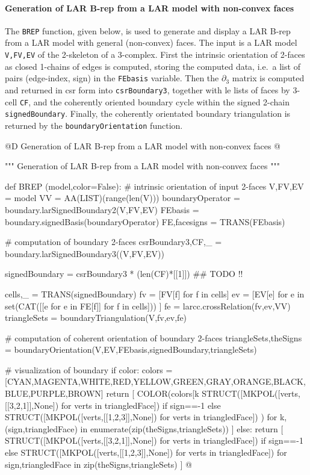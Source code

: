 \documentclass[11pt,oneside]{article}    %
\begin{document}
\paragraph{Generation of LAR B-rep from a LAR model with non-convex faces}

The \texttt{BREP} function, given below, is used to generate and display a  LAR B-rep from a LAR model with general (non-convex) faces. The input is a LAR model \texttt{V,FV,EV} of the 2-skeleton of a 3-complex. First the intrinsic orientation of 2-faces as closed 1-chains of edges is computed,  storing the computed data, i.e.~a list of pairs (edge-index, sign) in the \texttt{FEbasis} variable. Then the $\partial_3$ matrix is computed and returned in csr form into \texttt{csrBoundary3}, together with le lists of faces by 3-cell \texttt{CF}, and the coherently oriented boundary cycle within the signed 2-chain \texttt{signedBoundary}. Finally, the coherently orientated boundary triangulation is returned by the \texttt{boundaryOrientation} function.

@D Generation of LAR B-rep from a LAR model with non-convex faces
@{""" Generation of LAR B-rep from a LAR model with non-convex faces """

def BREP (model,color=False):
    # intrinsic orientation of input 2-faces
    V,FV,EV = model
    VV = AA(LIST)(range(len(V)))
    boundaryOperator = boundary.larSignedBoundary2(V,FV,EV)
    FEbasis = boundary.signedBasis(boundaryOperator)
    FE,facesigns = TRANS(FEbasis)
    
    # computation of boundary 2-faces
    csrBoundary3,CF,_ = boundary.larSignedBoundary3((V,FV,EV))
    
    signedBoundary = csrBoundary3 * (len(CF)*[[1]])  ## TODO !!
    
    cells,_ = TRANS(signedBoundary)
    fv = [FV[f] for f in cells]
    ev = [EV[e] for e in set(CAT([[e for e in FE[f]] for f in cells])) ]
    fe = larcc.crossRelation(fv,ev,VV)
    triangleSets = boundaryTriangulation(V,fv,ev,fe) 
    
    # computation of coherent orientation of boundary 2-faces
    triangleSets,theSigns = boundaryOrientation(V,EV,FEbasis,signedBoundary,triangleSets)

    # visualization of boundary
    if color:
        colors = [CYAN,MAGENTA,WHITE,RED,YELLOW,GREEN,GRAY,ORANGE,BLACK,BLUE,PURPLE,BROWN]
        return [ COLOR(colors[k%
                 STRUCT([MKPOL([verts,[[3,2,1]],None]) for verts in triangledFace])
        		 if sign==-1 else 
        		 STRUCT([MKPOL([verts,[[1,2,3]],None])  for verts in triangledFace])
                 ) 
        for k,(sign,triangledFace) in enumerate(zip(theSigns,triangleSets)) ]
    else:
        return [ STRUCT([MKPOL([verts,[[3,2,1]],None])  for verts in triangledFace])
        		 if sign==-1 else 
        		 STRUCT([MKPOL([verts,[[1,2,3]],None])  for verts in triangledFace])
        for sign,triangledFace in zip(theSigns,triangleSets) ]
@}
\end{document}
